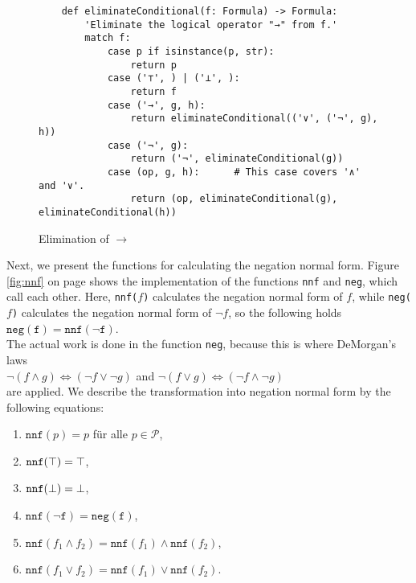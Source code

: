 \begin{figure}[!ht]
  \centering
\begin{verbatim}
    def eliminateConditional(f: Formula) -> Formula:
        'Eliminate the logical operator "→" from f.'
        match f:
            case p if isinstance(p, str): 
                return p
            case ('⊤', ) | ('⊥', ):
                return f
            case ('→', g, h): 
                return eliminateConditional(('∨', ('¬', g), h))
            case ('¬', g):
                return ('¬', eliminateConditional(g))
            case (op, g, h):      # This case covers '∧' and '∨'.
                return (op, eliminateConditional(g), eliminateConditional(h))
\end{verbatim}
\vspace*{-0.3cm}
  \caption{Elimination of $\rightarrow$}
  \label{fig:eliminate-folgt}
\end{figure}
\pagebreak
Next, we present the functions for calculating the negation normal form.
Figure
\ref{fig:nnf} on page \pageref{fig:nnf} shows the implementation of the functions
\texttt{nnf} and \texttt{neg},
which call each other.  Here, \texttt{nnf($f$)} calculates the negation normal form of $f$, while  
\texttt{neg($f$)} calculates the negation normal form of $\neg f$, so the following holds
\\[0.2cm]
\hspace*{1.3cm}
$\texttt{neg}(\texttt{f}) = \texttt{nnf}(\neg \texttt{f})$.
\\[0.2cm]
 The actual work is done in the
function \texttt{neg}, because this is where DeMorgan's laws 
\\[0.2cm]
\hspace*{1.3cm}
$\neg (f \wedge g) \Leftrightarrow (\neg f \vee \neg g)$ \quad and \quad 
$\neg (f \vee g) \Leftrightarrow (\neg f \wedge \neg g)$ 
\\[0.2cm]
are applied.  We describe the transformation into negation normal form by 
the following equations: 
\begin{enumerate}
\item $\texttt{nnf}(p) = p$ \quad für alle $p \in \mathcal{P}$,
\item $\texttt{nnf}(\top) = \top$,
\item $\texttt{nnf}(\bot) = \bot$,
\item $\texttt{nnf}(\neg \texttt{f}) = \texttt{neg}(\texttt{f})$,
\item $\texttt{nnf}(f_1 \wedge f_2) = \texttt{nnf}(f_1) \wedge \texttt{nnf}(f_2)$,
\item $\texttt{nnf}(f_1 \vee f_2) = \texttt{nnf}(f_1) \vee \texttt{nnf}(f_2)$.
\end{enumerate}

